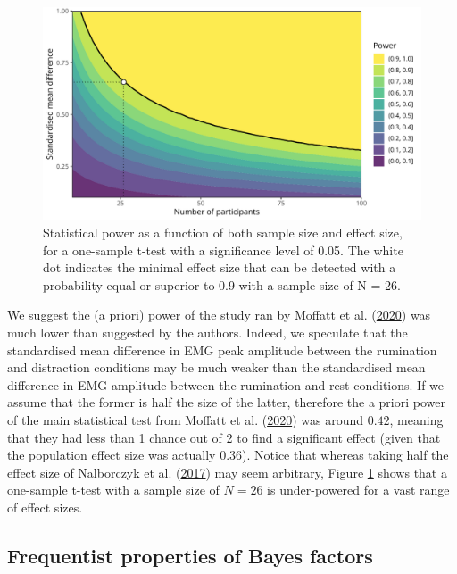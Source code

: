 \documentclass[
  man, donotrepeattitle,floatsintext]{apa6}
\begin{document}
\begin{figure}[!htb]

{\centering \includegraphics[width=1\linewidth]{manuscript_files/figure-latex/power-1} 

}

\caption{Statistical power as a function of both sample size and effect size, for a one-sample t-test with a significance level of 0.05. The white dot indicates the minimal effect size that can be detected with a probability equal or superior to 0.9 with a sample size of N = 26.}\label{fig:power}
\end{figure}

We suggest the (a priori) power of the study ran by Moffatt et al. (\protect\hyperlink{ref-moffatt_inner_2020}{2020}) was much lower than suggested by the authors. Indeed, we speculate that the standardised mean difference in EMG peak amplitude between the rumination and distraction conditions may be much weaker than the standardised mean difference in EMG amplitude between the rumination and rest conditions. If we assume that the former is half the size of the latter, therefore the a priori power of the main statistical test from Moffatt et al. (\protect\hyperlink{ref-moffatt_inner_2020}{2020}) was around \(0.42\), meaning that they had less than 1 chance out of 2 to find a significant effect (given that the population effect size was actually \(0.36\)). Notice that whereas taking half the effect size of Nalborczyk et al. (\protect\hyperlink{ref-nalborczyk_orofacial_2017}{2017}) may seem arbitrary, Figure \ref{fig:power} shows that a one-sample t-test with a sample size of \(N = 26\) is under-powered for a vast range of effect sizes.

\hypertarget{frequentist-properties-of-bayes-factors}{%
\subsection{Frequentist properties of Bayes factors}\label{frequentist-properties-of-bayes-factors}}
\end{document}
